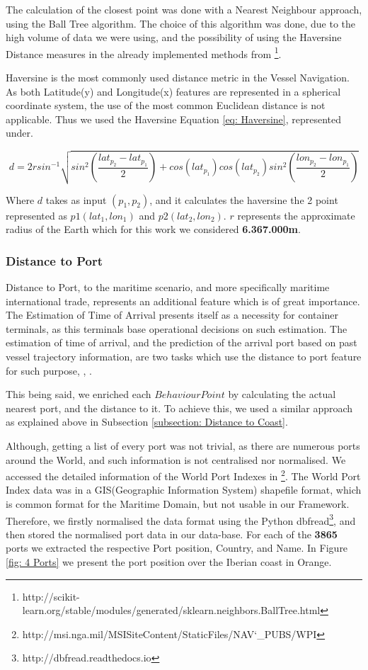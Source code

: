 The calculation of the closest point was done with a Nearest Neighbour approach, using the Ball Tree algorithm. The choice of this algorithm was done, due to the high volume of data we were using, and the possibility of using the Haversine Distance measures in the already implemented methods from \footnote{http://scikit-learn.org/stable/modules/generated/sklearn.neighbors.BallTree.html}.

Haversine is the most commonly used distance metric in the Vessel Navigation. As both Latitude(y) and Longitude(x) features are represented in a spherical coordinate system, the use of the most common Euclidean distance is not applicable. Thus we used the Haversine Equation \ref{eq: Haversine}, represented under.

\begin{equation}
d = 2r sin ^{-1} \sqrt{sin^2(\frac{lat_{p_2}-lat_{p_1}}{2})+cos(lat_{p_1})cos(lat_{p_2})sin^2(\frac{lon_{p_2}-lon_{p_1}}{2})}
\label{eq: Haversine}
\end{equation}

Where $d$ takes as input $({p_1}, {p_2})$, and it calculates the haversine the 2 point represented as $p1(lat_1, lon_1)$ and $p2(lat_2, lon_2)$. $r$ represents the approximate radius of the Earth which for this work we considered \textbf{6.367.000m}.

\subsubsection{Distance to Port}
Distance to Port, to the maritime scenario, and more specifically maritime international trade, represents an additional feature which is of great importance. The Estimation of Time of Arrival presents itself as a necessity for container terminals, as this terminals base operational decisions on such estimation. The estimation of time of arrival, and the prediction of the arrival port based on past vessel trajectory information, are two tasks which use the distance to port feature for such purpose, \cite{Moussa2018ScalableSpark}, \cite{Rosca2018PredictingRoutes}.
 
This being said, we enriched each $Behaviour Point$ by calculating the actual nearest port, and the distance to it. To achieve this, we used a similar approach as explained above in Subsection \ref{subsection: Distance to Coast}.

Although, getting a list of every port was not trivial, as there are numerous ports around the World, and such information is not 
centralised nor normalised.
We accessed the detailed information of the World Port Indexes in \footnote{http://msi.nga.mil/MSISiteContent/StaticFiles/NAV\char`_PUBS/WPI}. The World Port Index data was in a GIS(Geographic Information System) shapefile format, which is common format for the Maritime Domain, but not usable in our Framework. Therefore, we firstly normalised the data format using the Python dbfread\footnote{http://dbfread.readthedocs.io}, and then stored the normalised port data in our data-base. 
For each of the \textbf{3865} ports we extracted the respective Port position, Country, and Name. 
In Figure \ref{fig: 4 Ports} we present the port position over the Iberian coast in Orange.

